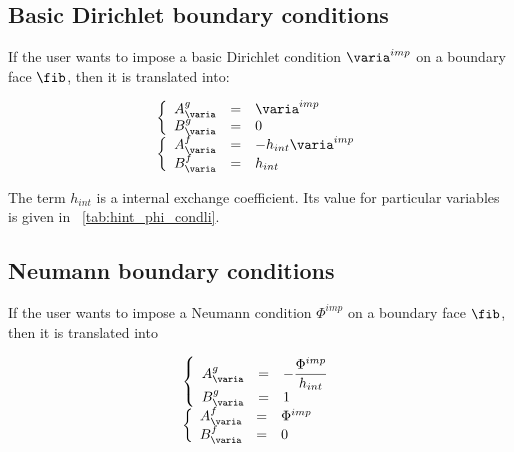 \subsection{Basic Dirichlet boundary conditions}

If the user wants to impose a basic Dirichlet condition $\varia^{imp}$ on a boundary face $\fib$,
then it is translated into:

\begin{equation}
\begin{array}{l}
\left\lbrace
\begin{array}{r c l}
A^g_\varia & = &\varia^{imp} \\
B^g_\varia & = & 0
\end{array}
\right.
\\
\left\lbrace
\begin{array}{r c l}
A^f_\varia & = & -h_{int} \varia^{imp} \\
B^f_\varia & = & h_{int}
\end{array}
\right.
\end{array}
\end{equation}

The term $h_{int}$ is a internal exchange coefficient. Its value for particular variables is 
given in \tablename~\ref{tab:hint_phi_condli}.

\subsection{Neumann boundary conditions}

If the user wants to impose a Neumann condition $\Phi^{imp}$ on a boundary face $\fib$,
then it is translated into

\begin{equation}
\begin{array}{l}
\left\lbrace
\begin{array}{r c l}
A^g_\varia & = & - \dfrac{\Phi^{imp}}{h_{int}} \\
B^g_\varia & = & 1
\end{array}
\right.
\\
\left\lbrace
\begin{array}{r c l}
A^f_\varia & = & \Phi^{imp} \\
B^f_\varia & = & 0
\end{array}
\right.
\end{array}
\end{equation}


